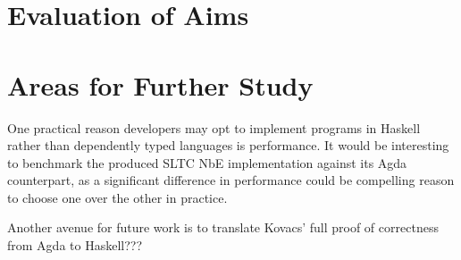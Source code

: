 \section{Evaluation of Aims}

\section{Areas for Further Study}


One practical reason developers may opt to implement programs in Haskell rather than dependently typed languages is performance. It would be interesting to benchmark the produced SLTC NbE implementation against its Agda counterpart, as a significant difference in performance could be compelling reason to choose one over the other in practice. 

Another avenue for future work is to translate Kovacs' full proof of correctness from Agda to Haskell???

